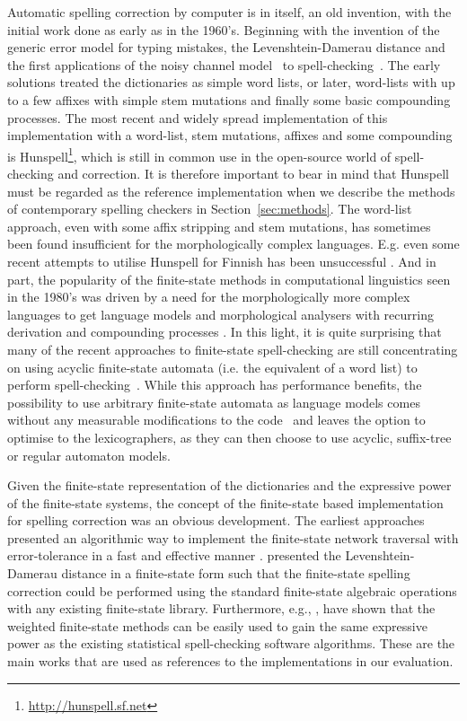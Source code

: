 \documentclass[a4paper,12pt]{article}
\begin{document}
Automatic spelling correction by computer is in itself, an old invention, with
the initial work done as early as in the 1960's. Beginning with the invention
of the generic error model for typing mistakes, the Levenshtein-Damerau
distance \cite[]{levenshtein/1966,damerau/1964} and the first applications of
the noisy channel model~\cite[]{shannon/1948} to
spell-checking~\cite[]{raviv/1967}. The early solutions treated the
dictionaries as simple word lists, or later, word-lists with up to a few
affixes with simple stem mutations and finally some basic compounding
processes. The most recent and widely spread implementation of this
implementation with a word-list, stem mutations, affixes and some compounding
is Hunspell\footnote{\url{http://hunspell.sf.net}}, which is still in common
use in the open-source world of spell-checking and correction. It is therefore
important to bear in mind that Hunspell must be regarded as the reference
implementation when we describe the methods of contemporary spelling
checkers in Section~\ref{sec:methods}. The word-list approach, even with some
affix stripping and stem mutations, has sometimes been found insufficient for
the morphologically complex languages. E.g. even some recent attempts to
utilise Hunspell for Finnish has been unsuccessful \cite[]{pitkanen/2006}.
And in part, the popularity of the finite-state methods in computational
linguistics seen in the 1980's was driven by a need for the morphologically
more complex languages to get language models and morphological analysers with
recurring derivation and compounding processes
\cite[]{beesley2004morphological}. In this light, it is quite surprising that
many of the recent approaches to finite-state spell-checking are still
concentrating on using acyclic finite-state automata (i.e. the equivalent of
a word list) to perform
spell-checking~\cite[]{watson2003new,deorowicz2005correcting}. While this
approach has performance benefits, the possibility to use arbitrary
finite-state automata as language models comes without any measurable
modifications to the code~\cite[e.g.][]{pirinen/2010/lrec} and leaves the
option to optimise to the lexicographers, as they can then choose to use
acyclic, suffix-tree or regular automaton models.

Given the finite-state representation of the dictionaries and the expressive
power of the finite-state systems, the concept of the finite-state based
implementation for spelling correction was an obvious development. The earliest
approaches presented an algorithmic way to implement the finite-state network
traversal with error-tolerance \cite[]{oflazer/1996} in a fast and effective
manner \cite[]{agata/2002,hulden/2009}. \cite{schulz/2002} presented the
Levenshtein-Damerau distance in a finite-state form such that the finite-state
spelling correction could be performed using the standard finite-state
algebraic operations with any existing finite-state library.  Furthermore,
e.g., \cite{pirinen/2010/lrec}, have shown that the weighted finite-state
methods can be easily used to gain the same expressive power as the existing
statistical spell-checking software algorithms. These are the main works that
are used as references to the implementations in our evaluation.
\end{document}
